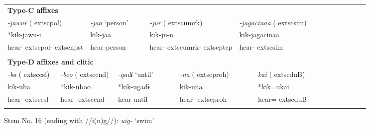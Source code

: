\begin{tabularx}{\textwidth}{XXXXXXXXXXXXXXXXXXXXXXX}
\multicolumn{23}{X}{{\bfseries Type-C affixes}}\\
\multicolumn{3}{X}{{ \textit{{}-jawur} (	extsc{pol})}} & \multicolumn{4}{X}{{ \textit{{}-jaa} ‘person’}} & \multicolumn{4}{X}{{ \textit{{}-jur} (	extsc{umrk})}} & \multicolumn{4}{X}{{ \textit{{}-jagacinaa} (	extsc{sim})}} & \multicolumn{8}{X}{}\\
\multicolumn{3}{X}{{ *kik-jawu-i}} & \multicolumn{4}{X}{kik-jaa} & \multicolumn{4}{X}{{ kik-ju-n}} & \multicolumn{4}{X}{{ kik-jagacinaa}} & \multicolumn{8}{X}{}\\
\multicolumn{3}{X}{hear-	extsc{pol}-	extsc{npst}} & \multicolumn{4}{X}{hear-person} & \multicolumn{4}{X}{hear-	extsc{umrk}-	extsc{ptcp}} & \multicolumn{4}{X}{hear-	extsc{sim}} & \multicolumn{8}{X}{}\\
\multicolumn{23}{X}{}\\
\multicolumn{23}{X}{{\bfseries Type-D affixes and clitic}}\\
\multicolumn{2}{X}{{ \textit{{}-ba} (	extsc{csl})}} & \multicolumn{2}{X}{{ \textit{{}-boo} (	extsc{cnd})}} & \multicolumn{4}{X}{{ \textit{{}-gadɨ} ‘until’}} & \multicolumn{4}{X}{{ \textit{{}-na} (	extsc{proh})}} & \multicolumn{4}{X}{{ \textit{kai} (	extsc{du}B)}} & \multicolumn{7}{X}{}\\
\multicolumn{2}{X}{{ kik-uba}} & \multicolumn{2}{X}{{ *kik-uboo}} & \multicolumn{4}{X}{{ *kik-ugadɨ}} & \multicolumn{4}{X}{{ kik-una}} & \multicolumn{4}{X}{{ *kik=ukai}} & \multicolumn{7}{X}{}\\
\multicolumn{2}{X}{hear-	extsc{csl}} & \multicolumn{2}{X}{hear-	extsc{cnd}} & \multicolumn{4}{X}{hear-until} & \multicolumn{4}{X}{hear-	extsc{proh}} & \multicolumn{4}{X}{hear=	extsc{du}B} & \multicolumn{7}{X}{}\\
\lspbottomrule
\end{tabularx}
Stem No. 16 (ending with //i(n)g//): \textit{uig-} ‘swim’

\tablefirsthead{}

